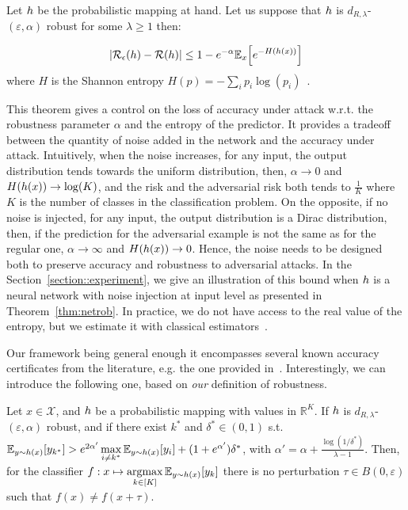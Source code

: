 \begin{thm}

\label{thm:bound}
Let $h$ be the probabilistic mapping at hand. Let us suppose that  $h$ is $d_{R,\lambda}$-$(\varepsilon,\alpha)$ robust for some $\lambda\geq1$ then:

$$|\riskadv(\probmap)-\risk(\probmap)|\leq 1-e^{-\alpha}\mathbb{E}_x\left[e^{-H(\probmap(x))}\right]$$
where $H$ is the Shannon entropy $H(p)=-\sum_i p_i \log(p_i)\enspace.$
\end{thm}
This theorem gives a control on the loss of accuracy under attack w.r.t. the robustness parameter $\alpha$ and the entropy of the predictor. It provides a tradeoff between the quantity of noise added in the network and the accuracy under attack. Intuitively, when the noise increases, for any input, the output distribution tends towards the uniform distribution, then, $\alpha\rightarrow0$ and $H(h(x))\rightarrow \log(K)$, and the risk and the adversarial risk both tends to $\frac{1}{K}$ where $K$ is the number of classes in the classification problem. On the opposite, if no noise is injected, for any input, the output distribution is a  Dirac distribution, then, if the prediction for the adversarial example is not the same as for the regular one, $\alpha\rightarrow\infty$ and $H(h(x))\rightarrow 0$. Hence, the noise needs to be designed both to preserve accuracy and robustness to adversarial attacks. In the Section~\ref{section::experiment}, we give an illustration of this bound when $h$ is a neural network with noise injection at input level as presented in Theorem~\ref{thm:netrob}. In practice, we do not have access to the real value of the  entropy, but we estimate it with classical estimators~\citep{paninski2003estimation}.

Our framework being general enough it encompasses several known accuracy certificates from the literature, e.g. the one provided in~\citep{lecuyer2018certified}. Interestingly, we can introduce the following one, based on \emph{our} definition of robustness. 

\begin{thm}
\label{thm::Lecuyerlike}
Let $x \in \mathcal{X}$, and $h$ be a probabilistic mapping with values in $\mathbb{R}^{K}$. If $h$ is $d_{R,\lambda}$-$(\varepsilon,\alpha)$ robust, and if there exist $k^{*}$ and $ \delta^{*} \in (0,1)$ s.t. $\mathbb{E}_{y \sim \probmap(x)}\left[ y_{k^{*}} \right] > e^{2\alpha'} \max\limits_{i \neq k^{*}}\mathbb{E}_{y \sim \probmap(x)}\left[ y_i \right] + (1+ e^{\alpha'})\delta^{*}$, with $\alpha'= \alpha + \frac{\log(1/\delta^{*})}{\lambda - 1}$. Then, for the classifier $ f: x \mapsto \argmaxB\limits_{k \in [K]}\mathbb{E}_{y \sim \probmap(x)}\left[ y_k \right]$ there is no perturbation $\tau \in B(0,\varepsilon)$ such that $f(x)\neq f(x+\tau)$. 
\end{thm}

